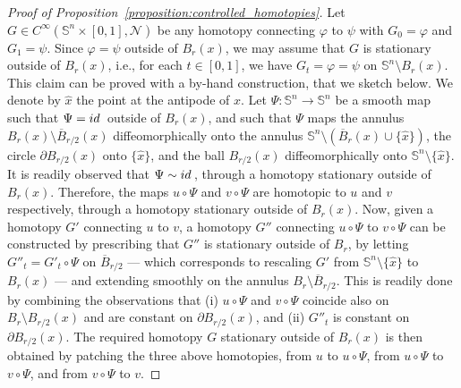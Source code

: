 \documentclass[10pt,a4paper]{amsart}
\def\S{{\mathbb S}}
\def\id{{\rm id\, }}
\def\n{{\mathcal N}}
\begin{document}
\begin{proof}[Proof of Proposition~\ref{proposition:controlled_homotopies}]
	Let $ G \in C^{\infty}(\S^n\times[0,1],\n)$ be any homotopy connecting $ \varphi $ to $ \psi $ with $G_0 = \varphi$ and $G_1 = \psi$.
	Since $ \varphi = \psi $ outside of $ B_r(x)  $, we may assume that $ G $ is stationary outside of $ B_r(x)  $, i.e., for each $t\in[0,1]$, we have $G_t= \varphi = \psi$ on $\S^n \setminus B_r(x)$.
	This claim can be proved with a by-hand construction, that we sketch below.
	We denote by \( \hat{x} \) the point at the antipode of \( x \).
	Let \( \Psi \colon \S^{n} \to \S^{n} \) be a smooth map such that \( \Psi = \id \) outside of \( B_{r}(x) \), and such that \( \Psi \) maps the annulus \( B_{r}(x) \setminus \overline{B}_{r/2}(x) \) diffeomorphically onto the annulus \( \S^{n} \setminus (\overline{B}_{r}(x) \cup \{\hat{x}\}) \), the circle \( \partial B_{r/2}(x) \) onto \( \{\hat{x}\} \), and the ball \( B_{r/2}(x) \) diffeomorphically onto \( \S^{n} \setminus \{\hat{x}\} \).
	It is readily observed that \( \Psi \sim \id \), through a homotopy stationary outside of \( B_{r}(x) \).
	Therefore, the maps \( u \circ \Psi \) and \( v \circ \Psi \) are homotopic to \( u \) and \( v \) respectively, through a homotopy stationary outside of \( B_{r}(x) \).
	Now, given a homotopy \( G' \) connecting \( u \) to \( v \), a homotopy \( G'' \) connecting \( u \circ \Psi \) to \( v \circ \Psi \) can be constructed by prescribing that \( G'' \) is stationary outside of \( B_{r} \), by letting \( G''_{t} = G'_{t} \circ \Psi \) on \( \overline{B}_{r/2} \) --- which corresponds to rescaling \( G' \) from \( \S^{n} \setminus \{ \hat{x} \}\) to \( B_{r}(x) \) --- and extending smoothly on the annulus \( B_{r} \setminus \overline{B}_{r/2} \).
	This is readily done by combining the observations that (i) \( u \circ \Psi \) and \( v \circ \Psi \) coincide also on \( B_{r} \setminus B_{r/2}(x) \) and are constant on \( \partial B_{r/2}(x) \), and (ii) \( G''_{t} \) is constant on \( \partial B_{r/2}(x) \).
	The required homotopy \( G \) stationary outside of $ B_r(x)  $ is then obtained by patching the three above homotopies, from \( u \) to \( u \circ \Psi \), from \( u \circ \Psi \) to \( v \circ \Psi \), and from \( v \circ \Psi \) to \( v \).
	

\end{proof}
\end{document}
